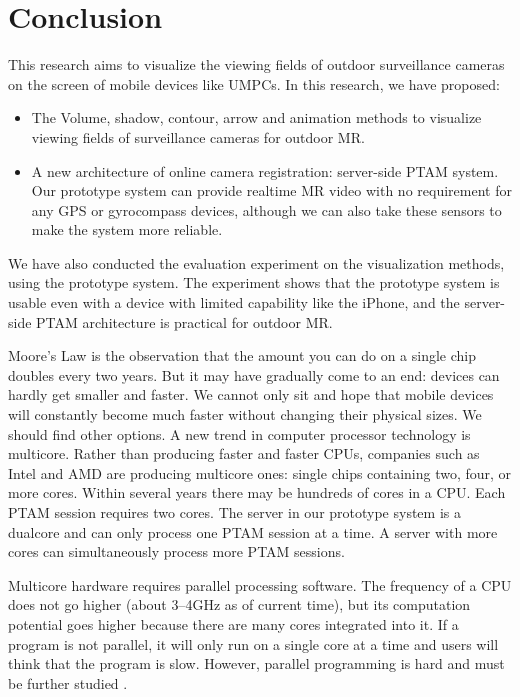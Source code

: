 \chapter{Conclusion}
\label{Chapter5}

This research aims to visualize the viewing fields of outdoor surveillance cameras on the screen of mobile devices like UMPCs. In this research, we have proposed:

\begin{itemize}
	\item The Volume, shadow, contour, arrow and animation methods to visualize viewing fields of surveillance cameras for outdoor MR.
	\item A new architecture of online camera registration: server-side PTAM \cite{Reference12} system. Our prototype system can provide realtime MR video with no requirement for any GPS or gyrocompass devices, although we can also take these sensors to make the system more reliable.
\end{itemize}

We have also conducted the evaluation experiment on the visualization methods, using the prototype system. The experiment shows that the prototype system is usable even with a device with limited capability like the iPhone, and the server-side PTAM architecture is practical for outdoor MR.

Moore's Law is the observation that the amount you can do on a single chip doubles every two years. But it may have gradually come to an end: devices can hardly get smaller and faster. We cannot only sit and hope that mobile devices will constantly become much faster without changing their physical sizes. We should find other options. A new trend in computer processor technology is multicore. Rather than producing faster and faster CPUs, companies such as Intel and AMD are producing multicore ones: single chips containing two, four, or more cores. Within several years there may be hundreds of cores in a CPU. Each PTAM session requires two cores. The server in our prototype system is a dualcore and can only process one PTAM session at a time. A server with more cores can simultaneously process more PTAM sessions.

Multicore hardware requires parallel processing software. The frequency of a CPU does not go higher (about 3--4GHz as of current time), but its computation potential goes higher because there are many cores integrated into it. If a program is not parallel, it will only run on a single core at a time and users will think that the program is slow. However, parallel programming is hard and must be further studied \cite{Reference17}.

